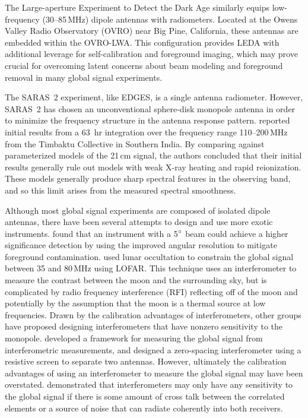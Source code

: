\begin{bibunit}
The Large-aperture Experiment to Detect the Dark Age \citep[LEDA;][]{2018MNRAS.478.4193P} similarly
equips low-frequency (30--85\,MHz) dipole antennas with radiometers. Located at the Owens Valley
Radio Observatory (OVRO) near Big Pine, California, these antennas are embedded within the OVRO-LWA.
This configuration provides LEDA with additional leverage for self-calibration and foreground
imaging, which may prove crucial for overcoming latent concerns about beam modeling and foreground
removal in many global signal experiments.

The SARAS~2 experiment, like EDGES, is a single antenna radiometer. However, SARAS~2 has chosen an
unconventional sphere-disk monopole antenna in order to minimize the frequency structure in the
antenna response pattern. \citet{2017ApJ...845L..12S} reported initial results from a 63~hr
integration over the frequency range 110--200\,MHz from the Timbaktu Collective in Southern India.
By comparing against parameterized models of the 21\,cm signal, the authors concluded that their
initial results generally rule out models with weak X-ray heating and rapid reionization. These
models generally produce sharp spectral features in the observing band, and so this limit arises
from the measured spectral smoothness.

Although most global signal experiments are composed of isolated dipole antennas, there have been
several attempts to design and use more exotic instruments. \citet{2013PhRvD..87d3002L} found that
an instrument with a 5$\mbox{$^\circ$}$ beam could achieve a higher significance detection by using the
improved angular resolution to mitigate foreground contamination. \citet{2015MNRAS.450.2291V} used
lunar occultation to constrain the global signal between 35 and 80\,MHz using LOFAR. This technique
uses an interferometer to measure the contrast between the moon and the surrounding sky, but is
complicated by radio frequency interference (RFI) reflecting off of the moon and potentially by the
assumption that the moon is a thermal source at low frequencies. Drawn by the calibration advantages
of interferometers, other groups have proposed designing interferometers that have nonzero
sensitivity to the monopole. \citet{2015ApJ...809...18P} developed a framework for measuring the
global signal from interferometric measurements, and \citet{2015ApJ...815...88S} designed a
zero-spacing interferometer using a resistive screen to separate two antennas. However, ultimately
the calibration advantages of using an interferometer to measure the global signal may have been
overstated.  \citet{2016ApJ...826..116V} demonstrated that interferometers may only have any
sensitivity to the global signal if there is some amount of cross talk between the correlated
elements or a source of noise that can radiate coherently into both receivers.


\end{bibunit}
